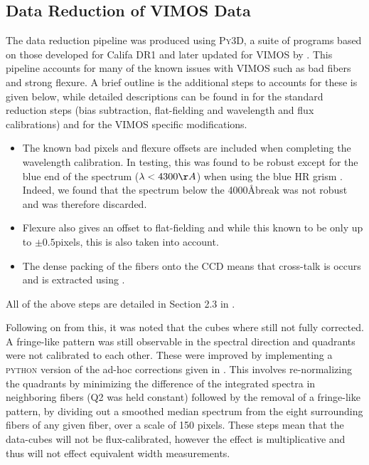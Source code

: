 	\subsection{Data Reduction of VIMOS Data}
		The data reduction pipeline was produced using \textsc{Py3D}, a suite of programs based on those developed for Califa DR1 \citep{Sanchez2011, Husemann2013} and later updated for VIMOS by \citet{Husemann2014}. This pipeline accounts for many of the known issues with VIMOS such as bad fibers and strong flexure. A brief outline is the additional steps to accounts for these is given below, while detailed descriptions can be found in \citet{Sanchez2011} for the standard reduction steps (bias subtraction, flat-fielding and wavelength and flux calibrations) and \citep{Husemann2014} for the VIMOS specific modifications. 
		\begin{itemize}
		\item The known bad pixels and flexure offsets are included when completing the wavelength calibration. In testing, this was found to be robust except for the blue end of the spectrum ($\lambda < 4300 \AA$) when using the blue HR grism \citep{Husemann2014}. Indeed, we found that the spectrum below the 4000\AA break was not robust and was therefore discarded.
		\item Flexure also gives an offset to flat-fielding and while this known to be only up to $\pm0.5$pixels, this is also taken into account.
		\item The dense packing of the fibers onto the CCD means that cross-talk is occurs and is extracted using \citep{Horne1986}. 
		\end{itemize}
		All of the above steps are detailed in Section 2.3 in \citet{Husemann2014}.


		Following on from this, it was noted that the cubes where still not fully corrected. A fringe-like pattern was still observable in the spectral direction and quadrants were not calibrated to each other. These were improved by implementing a \textsc{python} version of the ad-hoc corrections given in \citet{Lagerholm2012}. This involves re-normalizing the quadrants by minimizing the difference of the integrated spectra in neighboring fibers (Q2 was held constant) followed by the removal of a fringe-like pattern, by dividing out a smoothed median spectrum from the eight surrounding fibers of any given fiber, over a scale of 150 pixels. These steps mean that the data-cubes will not be flux-calibrated, however the effect is multiplicative and thus will not effect equivalent width measurements.  

